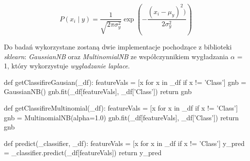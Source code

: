 \documentclass[12pt,a4paper]{article}
\begin{document}
$$ 
P(x_{i} \mid y) = 
\frac
{1}
{\sqrt{2 \pi \sigma^{2}_{y}}}
\exp
(- 
\frac
{(x_{i} - \mu_{y})^2)}
{2\sigma^{2}_{y}}
)
$$

Do badań wykorzystane zostaną dwie implementacje pochodzące z biblioteki \emph{sklearn}: \emph{GaussianNB} oraz \emph{MultinomialNB} ze współczynnikiem wygładzania  $\alpha$ = 1, który wykorzystuje \emph{wygładzanie laplace}.

\begin{python}
def getClassifireGausian(_df):
    featureVals = [x for x in _df if x != 'Class']
    gnb = GaussianNB()
    gnb.fit(_df[featureVals], _df['Class'])
    return gnb

def getClassifireMultinomial(_df):
    featureVals = [x for x in _df if x != 'Class']
    gnb = MultinomialNB(alpha=1.0)
    gnb.fit(_df[featureVals], _df['Class'])
    return gnb


def predict(_classifier, _df):
    featureVals = [x for x in _df if x != 'Class']
    y_pred = _classifier.predict(_df[featureVals])
    return y_pred
\end{python}
\end{document}
